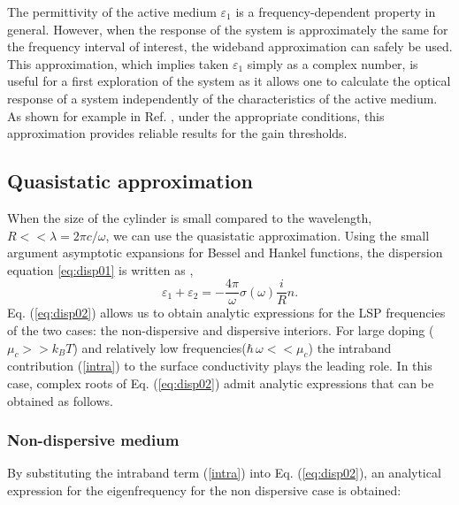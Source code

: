 \documentclass[9pt,twocolumn,twoside]{osajnl}
\begin{document}
The permittivity of the active medium $\varepsilon_1$ is a frequency-dependent property in general. However, when the response of the system is approximately the same for the frequency interval of interest, the wideband approximation can safely be used. This approximation, which implies taken $\varepsilon_1$ simply as a complex number, is useful for a first exploration of the system as it allows one to calculate the optical response of a system independently of the characteristics of the active medium. As shown for example in Ref. \cite{passarelli2019}, under the appropriate conditions, this approximation provides reliable results for the gain thresholds.

\subsection{Quasistatic approximation}

When the size of the cylinder is small compared to the wavelength, $R<<\lambda=2\pi c/\omega$, we can use the quasistatic approximation. 
 Using the small argument asymptotic
expansions for Bessel and Hankel functions, the dispersion equation \ref{eq:disp01} is written as \cite{CRD}, 
\begin{equation}
\varepsilon_1+\varepsilon_2=- \frac{4\pi}{\omega}\sigma(\omega) \frac{i}{R}n. \label{eq:disp02}
\end{equation}
Eq. (\ref{eq:disp02}) allows us to obtain analytic expressions for the LSP frequencies of the two cases: the non-dispersive and dispersive interiors. For large doping ($\mu_c >> k_B T$) and relatively low frequencies($\hbar \,\omega<< \mu_c$) the intraband contribution (\ref{intra}) to the surface
conductivity plays the leading role. In this case, complex roots of 
Eq. (\ref{eq:disp02}) admit analytic expressions that can be obtained as follows. 

\subsubsection{Non-dispersive medium}

By substituting the intraband term  (\ref{intra}) into Eq. (\ref{eq:disp02}), an analytical expression for the eigenfrequency for the non dispersive case is obtained:
\end{document}
